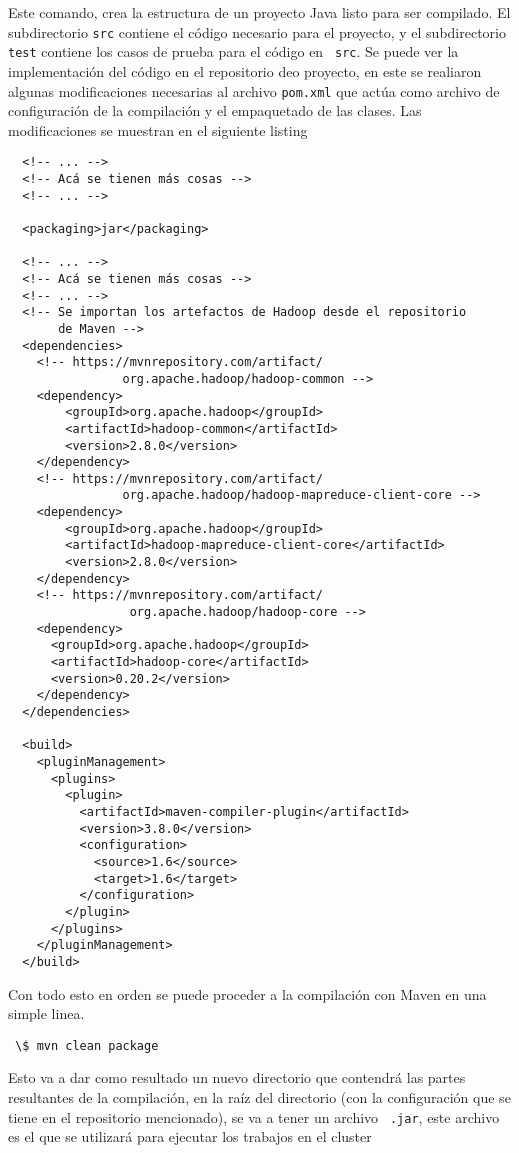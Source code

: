 Este comando, crea la estructura de un proyecto Java listo para ser compilado.
El subdirectorio {\tt src} contiene el código necesario para el proyecto, y el
subdirectorio {\tt test} contiene los casos de prueba para el código en {\tt
src}. Se puede ver la implementación del código en el repositorio deo proyecto,
en este se realiaron algunas modificaciones necesarias al archivo {\tt pom.xml}
que actúa como archivo de configuración de la compilación y el empaquetado de
las clases. Las modificaciones se muestran en el siguiente listing

\begin{verbatim}
  <!-- ... -->
  <!-- Acá se tienen más cosas -->
  <!-- ... -->

  <packaging>jar</packaging>

  <!-- ... -->
  <!-- Acá se tienen más cosas -->
  <!-- ... -->
  <!-- Se importan los artefactos de Hadoop desde el repositorio
       de Maven -->
  <dependencies>
    <!-- https://mvnrepository.com/artifact/
                org.apache.hadoop/hadoop-common -->
    <dependency>
        <groupId>org.apache.hadoop</groupId>
        <artifactId>hadoop-common</artifactId>
        <version>2.8.0</version>
    </dependency>
    <!-- https://mvnrepository.com/artifact/
                org.apache.hadoop/hadoop-mapreduce-client-core -->
    <dependency>
        <groupId>org.apache.hadoop</groupId>
        <artifactId>hadoop-mapreduce-client-core</artifactId>
        <version>2.8.0</version>
    </dependency>
    <!-- https://mvnrepository.com/artifact/
                 org.apache.hadoop/hadoop-core -->
    <dependency>
      <groupId>org.apache.hadoop</groupId>
      <artifactId>hadoop-core</artifactId>
      <version>0.20.2</version>
    </dependency>
  </dependencies>

  <build>
    <pluginManagement>
      <plugins>
        <plugin>
          <artifactId>maven-compiler-plugin</artifactId>
          <version>3.8.0</version>
          <configuration>
            <source>1.6</source>
            <target>1.6</target>
          </configuration>
        </plugin>
      </plugins>
    </pluginManagement>
  </build>
\end{verbatim}

Con todo esto en orden se puede proceder a la compilación con Maven en una
simple linea.

\begin{verbatim}
 \$ mvn clean package
\end{verbatim}

Esto va a dar como resultado un nuevo directorio que contendrá las partes
resultantes de la compilación, en la raíz del directorio (con la configuración
que se tiene en el repositorio mencionado), se va a tener un archivo {\tt
.jar}, este archivo es el que se utilizará para ejecutar los trabajos en el
\gls{cluster}

